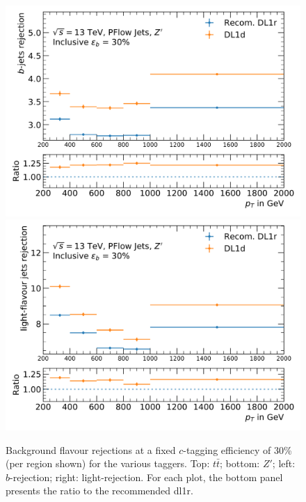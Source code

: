 \begin{center}
\begin{figure}[h!]
\centerline{
\includegraphics[scale=0.425]{Images/FTAG/DL1d/perpT/zpcb.png}
\includegraphics[scale=0.425]{Images/FTAG/DL1d/perpT/zpcu.png}
}
\caption{Background flavour rejections at a fixed $c$-tagging efficiency of 30\% (per region shown) for the various taggers. Top: $t\bar{t}$; bottom: $Z'$; left: $b$-rejection; right: light-rejection. For each plot, the bottom panel presents the ratio to the recommended \gls{dl1r}.}
\label{fig:ptDL1dz}
\end{figure}
\end{center}

